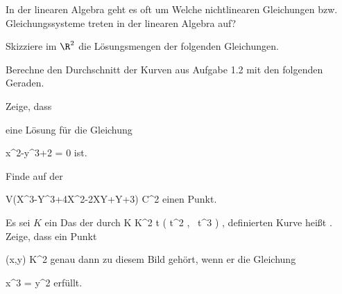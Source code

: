 \setcounter{section}{1}




{}
{
In der linearen Algebra geht es oft um
Welche nichtlinearen Gleichungen bzw. Gleichungssysteme treten in der linearen Algebra auf?

}
{} {}


{}
{
Skizziere im $\R^2$ die Lösungsmengen der folgenden Gleichungen.
 { }

}
{} {}


{}
{
Berechne den Durchschnitt der Kurven aus
Aufgabe 1.2
mit den folgenden Geraden.

}
{} {}


{}
{
 {Zeige, dass

 {  }

eine Lösung für die Gleichung

\mavergleichskettedisp
{\vergleichskette
{ x^2-y^3+2
}
{ =} { 0
}
{ } {
}
{ } {
}
{ } {
}
}
{}{}{}
ist.
}

}
{} {}


{}
{
Finde auf der

\mavergleichskettedisp
{\vergleichskette
{V(X^3-Y^3+4X^2-2XY+Y+3)
}
{ \subset} { {\mathbb C}^2
}
{ } {
}
{ } {
}
{ } {
}
}
{}{}{}
einen Punkt.

}
{} {}


{}
{
Es sei $K$ ein
Das
der durch
\maabbeledisp {} { K } { K^2
} { t } { \left( t^2  , \,  t^3                   \right)
} {,}
definierten Kurve heißt  {.} Zeige, dass ein Punkt

\mavergleichskette
{\vergleichskette
{ (x,y)
}
{ \in }{ K^2
}
{  }{
}
{    }{
}
{   }{
}
}
{}{}{}
genau dann zu diesem Bild gehört, wenn er die Gleichung

\mavergleichskette
{\vergleichskette
{ x^3
}
{ = }{ y^2
}
{  }{
}
{    }{
}
{   }{
}
}
{}{}{}
erfüllt.

}
{} {}


